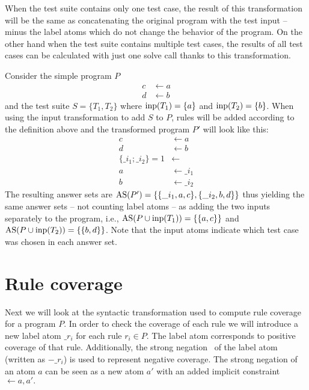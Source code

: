 When the test suite contains only one test case, the result of this transformation will be the same as concatenating the original program with the test input -- minus the label atoms which do not change the behavior of the program. On the other hand when the test suite contains multiple test cases, the results of all test cases can be calculated with just one solve call thanks to this transformation.

\begin{example}
\label{ex:input transformation}
    Consider the simple program $P$
    \begin{align*}
        c &\leftarrow a \\
        d &\leftarrow b
    \end{align*}
    and the test suite \(S = \{T_1, T_2\}\) where \(\operatorname{inp}(T_1) = \{a\}\) and \(\operatorname{inp}(T_2) = \{b\}\). When using the input transformation to add $S$ to $P$, rules will be added according to the definition above and the transformed program $P'$ will look like this:
    \begin{align*}
        c &\leftarrow a \\
        d &\leftarrow b \\
        \{\_i_1; \_i_2\} = 1 &\leftarrow \\
        a &\leftarrow \_i_1 \\
        b &\leftarrow \_i_2
    \end{align*}
    The resulting answer sets are \(\operatorname{AS}(P') = \{\{\_i_1, a, c\}, \{\_i_2, b, d\}\}\) thus yielding the same answer sets -- not counting label atoms -- as adding the two inputs separately to the program, i.e., \(\operatorname{AS}(P \cup \operatorname{inp}(T_1)) = \{\{a, c\}\}\) and \(\operatorname{AS}(P \cup \operatorname{inp}(T_2)) = \{\{b, d\}\}\). Note that the input atoms indicate which test case was chosen in each answer set.
\end{example}

\section{Rule coverage}
\label{sec:Computing coverage metrics for propositional programs/Rule coverage}
Next we will look at the syntactic transformation used to compute rule coverage for a program $P$. In order to check the coverage of each rule we will introduce a new label atom $\_r_i$ for each rule $r_i \in P$. The label atom corresponds to positive coverage of that rule. Additionally, the strong negation~\cite{GL91} of the label atom (written as $-\_r_i$) is used to represent negative coverage. The strong negation of an atom $a$ can be seen as a new atom $a'$ with an added implicit constraint $\leftarrow a, a'.$

